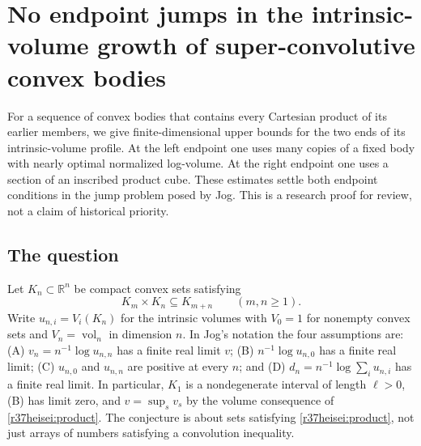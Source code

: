 \documentclass[11pt,a4paper]{article}
\numberwithin{equation}{section}
\theoremstyle{definition}
\theoremstyle{remark}
\newenvironment{sectionabstract}{\par\smallskip\begingroup\small\noindent}{\par\endgroup\medskip}
\begin{document}
\par\endgroup

\begingroup
\newcommand{\R}{\mathbb R}
\newcommand{\vol}{\operatorname{vol}}
\newcommand{\pr}{\operatorname{pr}}
\section{\texorpdfstring{No endpoint jumps in the intrinsic-volume growth of super-convolutive convex bodies}{No endpoint jumps in the intrinsic-volume growth of super-convolutive convex bodies}}\label{section:r37heisei}
\par\medskip


\begin{sectionabstract}
For a sequence of convex bodies that contains every Cartesian product of its earlier members, we give finite-dimensional upper bounds for the two ends of its intrinsic-volume profile. At the left endpoint one uses many copies of a fixed body with nearly optimal normalized log-volume. At the right endpoint one uses a section of an inscribed product cube. These estimates settle both endpoint conditions in the jump problem posed by Jog. This is a research proof for review, not a claim of historical priority.
\end{sectionabstract}

\subsection{The question}
Let $K_n\subset\R^n$ be compact convex sets satisfying
\begin{equation}
 K_m\times K_n\subseteq K_{m+n}\qquad(m,n\ge1).
 \label{r37heisei:product}
\end{equation}
Write $u_{n,i}=V_i(K_n)$ for the intrinsic volumes with $V_0=1$ for nonempty convex sets and $V_n=\vol_n$ in dimension $n$. In Jog's notation the four assumptions are: (A) $v_n=n^{-1}\log u_{n,n}$ has a finite real limit $v$; (B) $n^{-1}\log u_{n,0}$ has a finite real limit; (C) $u_{n,0}$ and $u_{n,n}$ are positive at every $n$; and (D) $d_n=n^{-1}\log\sum_i u_{n,i}$ has a finite real limit. In particular, $K_1$ is a nondegenerate interval of length $\ell>0$, (B) has limit zero, and $v=\sup_s v_s$ by the volume consequence of \eqref{r37heisei:product}. The conjecture is about sets satisfying \eqref{r37heisei:product}, not just arrays of numbers satisfying a convolution inequality.
\end{document}
